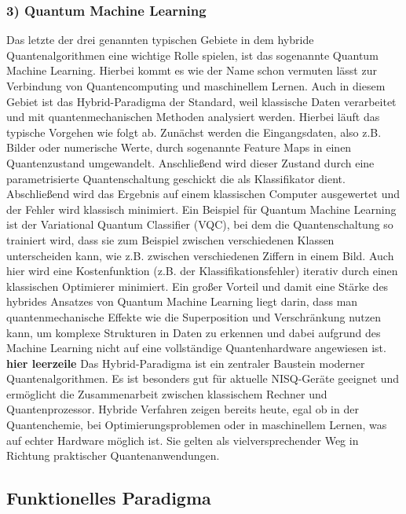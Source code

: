 \subsubsection*{3) Quantum Machine Learning}
Das letzte der drei genannten typischen Gebiete in dem hybride Quantenalgorithmen eine wichtige Rolle spielen, ist das sogenannte Quantum Machine Learning. Hierbei kommt es wie der Name schon vermuten lässt zur Verbindung von Quantencomputing und maschinellem Lernen. Auch in diesem Gebiet ist das Hybrid-Paradigma der Standard, weil klassische Daten verarbeitet und mit quantenmechanischen Methoden analysiert werden. 
Hierbei läuft das typische Vorgehen wie folgt ab. Zunächst werden die Eingangsdaten, also z.B. Bilder oder numerische Werte, durch sogenannte Feature Maps in einen Quantenzustand umgewandelt. Anschließend wird dieser Zustand durch eine parametrisierte Quantenschaltung geschickt die als Klassifikator dient. Abschließend wird das Ergebnis auf einem klassischen Computer ausgewertet und der Fehler wird klassisch minimiert. 
Ein Beispiel für Quantum Machine Learning ist der Variational Quantum Classifier (VQC), bei dem die Quantenschaltung so trainiert wird, dass sie zum Beispiel zwischen verschiedenen Klassen unterscheiden kann, wie z.B. zwischen verschiedenen Ziffern in einem Bild. Auch hier wird eine Kostenfunktion (z.B. der Klassifikationsfehler) iterativ durch einen klassischen Optimierer minimiert. 
Ein großer Vorteil und damit eine Stärke des hybrides Ansatzes von Quantum Machine Learning liegt darin, dass man quantenmechanische Effekte wie die Superposition und Verschränkung nutzen kann, um komplexe Strukturen in Daten zu erkennen und dabei aufgrund des Machine Learning nicht auf eine vollständige Quantenhardware angewiesen ist. 
\textbf{hier leerzeile}
Das Hybrid-Paradigma ist ein zentraler Baustein moderner Quantenalgorithmen. Es ist besonders gut für aktuelle NISQ-Geräte geeignet und ermöglicht die Zusammenarbeit zwischen klassischem Rechner und Quantenprozessor. Hybride Verfahren zeigen bereits heute, egal ob in der Quantenchemie, bei Optimierungsproblemen oder in maschinellem Lernen, was auf echter Hardware möglich ist. Sie gelten als vielversprechender Weg in Richtung praktischer Quantenanwendungen. 

\subsection{Funktionelles Paradigma}

\setlength{\parindent}{0pt} %
\setlength{\parskip}{1em}   %

